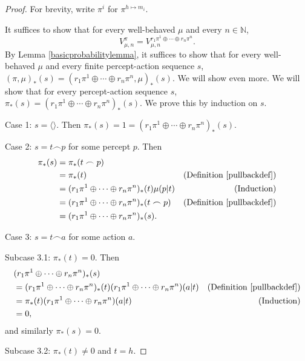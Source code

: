 \documentclass[runningheads]{llncs}
\begin{document}
\begin{proof}
    For brevity, write $\pi^i$ for $\pi^{h\mapsto m_i}$.

    It suffices to show that for every well-behaved $\mu$ and every $n\in\mathbb N$,
    \[
        V^{\pi}_{\mu,n}
        =
        V^{r_1\pi^1 \oplus \cdots \oplus r_n\pi^n}_{\mu,n}.
    \]
    By Lemma \ref{basicprobabilitylemma}, it suffices to show that for every
    well-behaved $\mu$ and every finite percept-action sequence $s$,
    $
    (\pi,\mu)_*(s)
    =
    (r_1\pi^1 \oplus \cdots \oplus r_n\pi^n,\mu)_*(s)
    $.
    We will show even more. We will show that for every percept-action sequence
    $s$, $\pi_*(s)=(r_1\pi^1 \oplus \cdots \oplus r_n\pi^n)_*(s)$.
    We prove this by induction on $s$.

    Case 1: $s=\langle\rangle$.
    Then $\pi_*(s)=1
    =(r_1\pi^1 \oplus \cdots \oplus r_n\pi^n)_*(s)$.

    Case 2: $s=t\frown p$ for some percept $p$.
    Then
    \begin{align*}
        \pi_*(s)
            &= \pi_*(t\frown p)\\
            &= \pi_*(t)
                &\mbox{(Definition \ref{pullbackdef})}\\
            &= (r_1\pi^1 \oplus \cdots \oplus r_n\pi^n)_*(t)\mu(p|t)
                &\mbox{(Induction)}\\
            &= (r_1\pi^1 \oplus \cdots \oplus r_n\pi^n)_*(t\frown p)
                &\mbox{(Definition \ref{pullbackdef})}\\
            &= (r_1\pi^1 \oplus \cdots \oplus r_n\pi^n)_*(s).
    \end{align*}

    Case 3: $s=t\frown a$ for some action $a$.

    Subcase 3.1: $\pi_*(t)=0$.
    Then
    \begin{align*}
        &{} (r_1\pi^1\oplus\cdots\oplus r_n\pi^n)_*(s)\\
            &= (r_1\pi^1\oplus\cdots\oplus r_n\pi^n)_*(t)
            (r_1\pi^1\oplus\cdots\oplus r_n\pi^n)(a|t)
                &\mbox{(Definition \ref{pullbackdef})}\\
            &= \pi_*(t)(r_1\pi^1\oplus\cdots\oplus r_n\pi^n)(a|t)
                &\mbox{(Induction)}\\
            &= 0,
    \end{align*}
    and similarly $\pi_*(s)=0$.

    Subcase 3.2: $\pi_*(t)\not=0$ and $t=h$.


\end{proof}
\end{document}
